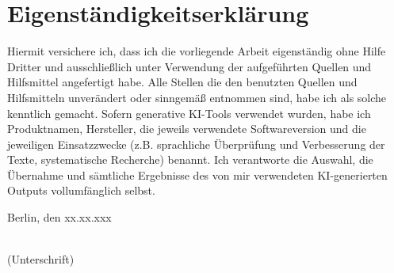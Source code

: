 \thispagestyle{empty}

\section*{Eigenständigkeitserklärung}

\begin{large}

\vspace*{4cm}

\noindent
Hiermit versichere ich, dass ich die vorliegende Arbeit eigenständig ohne Hilfe Dritter und ausschließlich unter Verwendung der
aufgeführten Quellen und Hilfsmittel angefertigt habe. Alle Stellen die den benutzten Quellen und Hilfsmitteln unverändert oder
sinngemäß entnommen sind, habe ich als solche kenntlich gemacht. Sofern generative KI-Tools verwendet wurden, habe ich Produktnamen, Hersteller, die jeweils verwendete Softwareversion und die jeweiligen Einsatzzwecke (z.B. sprachliche Überprüfung und Verbesserung der Texte, systematische Recherche) benannt.
Ich verantworte die Auswahl, die Übernahme und sämtliche Ergebnisse des von mir verwendeten KI-generierten Outputs vollumfänglich selbst.
\vspace{2cm}

\noindent
Berlin, den xx.xx.xxx

\vspace{3cm}

\hspace*{7cm}%
\dotfill\\
\hspace*{8.5cm}%
(Unterschrift)

\end{large}
